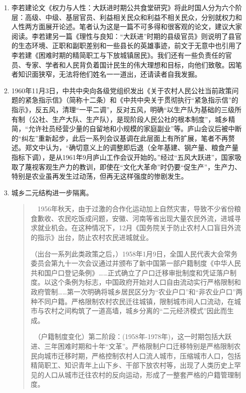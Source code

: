 \begin{enumerate}

\item 李若建论文《权力与人性：大跃进时期公共食堂研究》将此时国人分为六个阶层：高级、中级、基层官员、利益相关民众和利益不相关民众，分别就权力和人性两方面展开论述。笔者认为这是一篇不可多得和很客观的论文，建议大家阅读。李若建另一篇《理性与良知：“大跃进”时期的县级官员》则说明了县官的生态环境、正职和副职差别和一些县长的英雄事迹，前文于无意中也引用了李若建《困难时期的精简职工与下放城镇居民》。我们还有一些负责任的官员、专家、学者和人民背负着国计民生的伟大理想和目标，向他们致敬。因笔者知识面狭窄，无法将他们姓名一一道出，还请读者自我发掘。

\item 1960年11月3日，中共中央向各级党组织发出《关于农村人民公社当前政策问题的紧急指示信》（简称十二条）和《中共中央关于贯彻执行“紧急指示信”的指示》，反五风，清理“一平二调”，反对五风，明确“以生产队为基础的三级所有制（公社、生产大队、生产队），是现阶段人民公社的根本制度”，城乡精简，“允许社员经营少量的自留地和小规模的家庭副业”等。庐山会议后被中断的“纠左”重新起步，此后一系列会议基调在此层面上有所扩展，笔者不再赘述。郑文中认为，“确切意义上的调整即后退（全年基建、钢产量、粮食产量指标下调），是从1961年9月庐山工作会议开始的。”经过“五风大跃进”，国家吸取了蔑视客观生产力的教训，即使在“文化大革命”时仍要“促生产”，生产力、特别是农业虽再发生过动荡，但再无这样强度的惨剧发生。


\item 城乡二元结构进一步隔离。
  \begin{quotation}　1956年秋天，由于过激的合作化运动加上自然灾害，导致不少省份粮食歉收、农民吃饭成问题，安徽、河南等省出现大量农民外流，进城寻求就业机会。在这种情况下，12月《国务院关于防止农村人口盲目外流的指示》出台，防止农村农民进城就业。

    （出台一系列此类政策之后，）1958年1月9日，全国人民代表大会常务委员会第九十一次会议通过并颁布了新中国第一部户籍制度《中华人民共和国户口登记条例》……正式确立了户口迁移审批制度和凭证落户制度。以这个条例为标志，中国政府开始对人口自由流动实行严格限制和政府管制……第一次明确将城乡居民区分为“农业户口”和“非农业户口”两种不同户籍。严格限制农村农民迁往城镇，限制城市间人口流动，在城市与农村之间构筑了一道高墙，城乡分离的“二元经济模式”因此而生成。

    　（户籍制度变化）第二阶段：(1958年-1978年)，这一时期包括大跃进、三年困难时期和十年“文革”。严格限制户口迁移特别是严格限制农民向城市迁移时期，严格控制农村人口流人城市，压缩城市人口，包括精简职工、知识青年上山下乡、干部下放农村等，出现了人类历史上罕见的人口从城市迁往农村的反向运动，形成了一整套严格的户籍管理制度。\cite{quxiaohuji}
  \end{quotation}


\end{enumerate}
